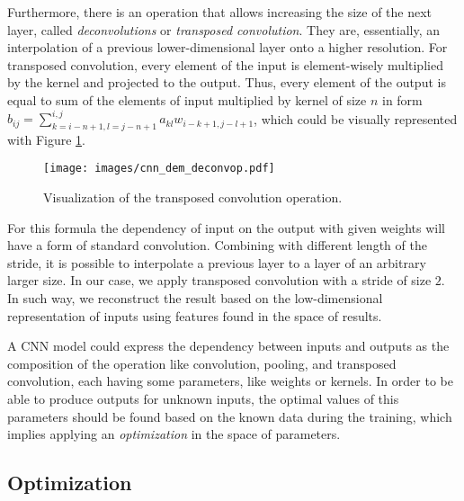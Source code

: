 
Furthermore, there is an operation that allows increasing the size of the next layer, called \emph{deconvolutions} or \textit{transposed convolution}.
They are, essentially, an interpolation of a previous lower-dimensional layer onto a higher resolution.
For transposed convolution, every element of the input is element-wisely multiplied by the kernel and projected to the output. Thus, every element of the output is equal to sum of the elements of input multiplied by kernel of size $n$ in form $b_{ij} = \sum_{k=i-n+1,l=j-n+1}^{i,j} a_{kl}w_{i-k+1,j-l+1}$, which could be visually represented with Figure \ref{fig:deconv_op}.
\begin{figure}[h]
	\centering
	\texttt{[image: images/cnn\_dem\_deconvop.pdf]}
	\label{fig:deconv_op}
	\caption{Visualization of the transposed convolution operation.}
\end{figure}
For this formula the dependency of input on the output with given weights will have a form of standard convolution.\cite{}
Combining with different length of the stride, it is possible to interpolate a previous layer to a layer of an arbitrary larger size. 
In our case, we apply transposed convolution with a stride of size $2$.
In such way, we reconstruct the result based on the low-dimensional representation of inputs using features found in the space of results.
\medskip

A CNN model could express the dependency between inputs and outputs as the composition of the operation like convolution, pooling, and transposed convolution, each having some parameters, like weights or kernels.
In order to be able to produce outputs for unknown inputs, the optimal values of this parameters should be found based on the known data during the training, which implies applying an \emph{optimization} in the space of parameters. 

\subsection{Optimization}

